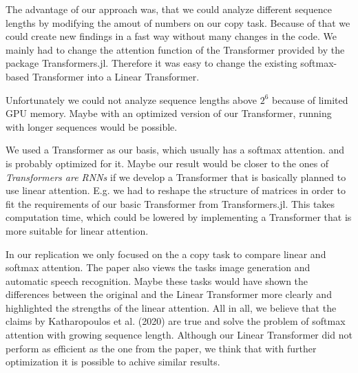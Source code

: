 \documentclass[DIV=13,fontsize=11pt]{scrartcl}
\begin{document}
The advantage of our approach was, that we could analyze different sequence lengths by modifying the amout of numbers on our copy task. Because of that we could create new findings in a fast way without many changes in the code. We mainly had to change the attention function of the Transformer provided by the package Transformers.jl. Therefore it was easy to change the existing softmax-based Transformer into a Linear Transformer.

Unfortunately we could not analyze sequence lengths above \(2^6\) because of limited GPU memory. Maybe with an optimized version of our Transformer, running with longer sequences would be possible. 

We used a Transformer as our basis, which usually has a softmax attention. and is probably optimized for it. Maybe our result would be closer to the ones of \textit{Transformers are RNNs} if we develop a Transformer that is basically planned to use linear attention. E.g. we had to reshape the structure of matrices in order to fit the requirements of our basic Transformer from Transformers.jl. This takes computation time, which could be lowered by implementing a Transformer that is more suitable for linear attention.

In our replication we only focused on the a copy task to compare linear and softmax attention. The paper also views the tasks image generation and automatic speech recognition. Maybe these tasks would have shown the differences between the original and the Linear Transformer more clearly and highlighted the strengths of the linear attention. 
All in all, we believe that the claims by Katharopoulos et al. (2020) are true and solve the problem of softmax attention with growing sequence length. Although our Linear Transformer did not perform as efficient as the one from the paper, we think that with further optimization it is possible to achive similar results.
\end{document}

